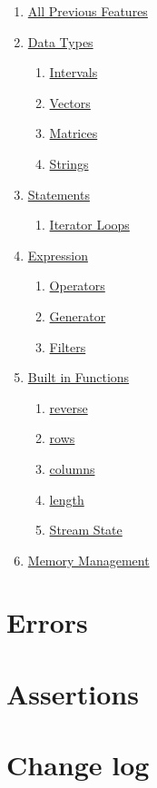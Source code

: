 \documentclass{article}
\begin{document}
  \begin{enumerate}[label*=\arabic*]
    \item \hyperref[sec:part1]{All Previous Features}
    \item \hyperref[sec:types]{Data Types}
    \begin{enumerate}[label*=.\arabic*]
      \item \hyperref[ssec:interval]{Intervals}
      \item \hyperref[sec:vector]{Vectors}
      \item \hyperref[sec:matrix]{Matrices}
      \item \hyperref[sec:string]{Strings}
    \end{enumerate}
    \item \hyperref[sec:statements]{Statements}
    \begin{enumerate}[label*=.\arabic*]
      \item \hyperref[sec:iteratorLoop]{Iterator Loops}
    \end{enumerate}
    \item \hyperref[sec:expressions]{Expression}
    \begin{enumerate}[label*=.\arabic*]
      \item \hyperref[sec:operators]{Operators}
      \item \hyperref[sec:generators]{Generator}
      \item \hyperref[sec:filters]{Filters}
    \end{enumerate}
    \item \hyperref[sec:builtIn]{Built in Functions}
    \begin{enumerate}[label*=.\arabic*]
      \item \hyperref[sec:reverse]{reverse}
      \item \hyperref[sec:rowsColumns]{rows}
      \item \hyperref[sec:rowsColumns]{columns}
      \item \hyperref[sec:length]{length}
      \item \hyperref[sec:streamState]{Stream State}
    \end{enumerate}
    \item \hyperref[sec:memory]{Memory Management}
  \end{enumerate}

\section{Errors}
\label{sec:errors}


\section{Assertions}
\label{sec:assertions}


\section{Change log}
\label{sec:changelog}

\end{document}
